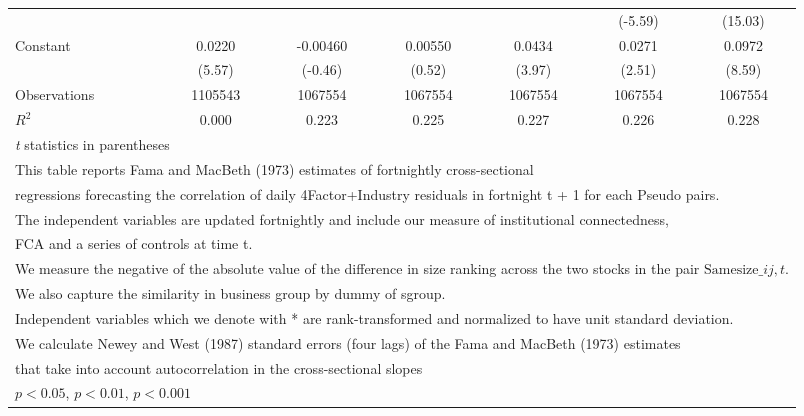 {\begin{tabular}{l*{6}{c}}
                    &                     &                     &                     &                     &     (-5.59)         &     (15.03)         \\
[1em]
Constant            &      0.0220\sym{***}&    -0.00460         &     0.00550         &      0.0434\sym{***}&      0.0271\sym{*}  &      0.0972\sym{***}\\
                    &      (5.57)         &     (-0.46)         &      (0.52)         &      (3.97)         &      (2.51)         &      (8.59)         \\
\hline
Observations        &     1105543         &     1067554         &     1067554         &     1067554         &     1067554         &     1067554         \\
\(R^{2}\)           &       0.000         &       0.223         &       0.225         &       0.227         &       0.226         &       0.228         \\
\hline\hline
\multicolumn{7}{l}{\footnotesize \textit{t} statistics in parentheses}\\
\multicolumn{7}{l}{\footnotesize This table reports Fama and MacBeth (1973) estimates of fortnightly cross-sectional}\\
\multicolumn{7}{l}{\footnotesize  regressions forecasting the correlation of daily 4Factor+Industry residuals in fortnight t + 1 for each Pseudo pairs.}\\
\multicolumn{7}{l}{\footnotesize The independent variables are updated fortnightly and include our measure of institutional connectedness,}\\
\multicolumn{7}{l}{\footnotesize  FCA and a series of controls at time t.}\\
\multicolumn{7}{l}{\footnotesize We measure the negative of the absolute value of the difference in size ranking across the two stocks in the pair $ \text{Samesize}\_{ij,t} $.}\\
\multicolumn{7}{l}{\footnotesize We also capture the similarity in business group by dummy of sgroup.}\\
\multicolumn{7}{l}{\footnotesize Independent variables which  we denote with * are rank-transformed and normalized to have unit standard deviation.}\\
\multicolumn{7}{l}{\footnotesize  We calculate Newey and West (1987) standard errors (four lags) of the Fama and MacBeth (1973) estimates }\\
\multicolumn{7}{l}{\footnotesize  that take into account autocorrelation in the cross-sectional slopes}\\
\multicolumn{7}{l}{\footnotesize \sym{*} \(p<0.05\), \sym{**} \(p<0.01\), \sym{***} \(p<0.001\)}\\
\end{tabular}
}
